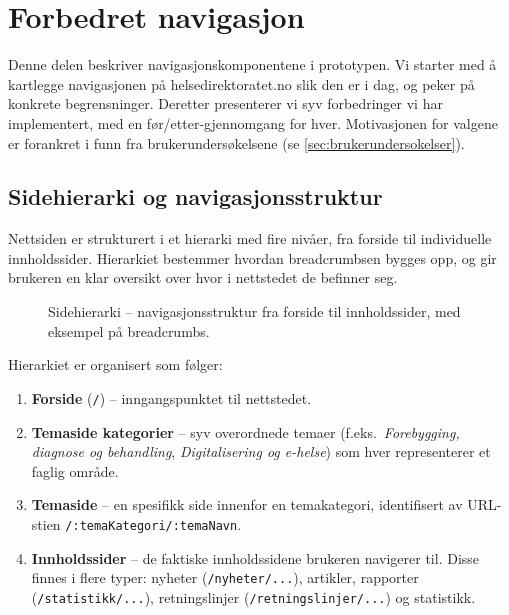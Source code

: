 \section{Forbedret navigasjon}
\label{sec:del3-navigasjon}

Denne delen beskriver navigasjonskomponentene i prototypen. Vi starter med
å kartlegge navigasjonen på helsedirektoratet.no slik den er i dag, og peker
på konkrete begrensninger. Deretter presenterer vi syv forbedringer vi har
implementert, med en før/etter-gjennomgang for hver. Motivasjonen for
valgene er forankret i funn fra brukerundersøkelsene (se
\autoref{sec:brukerundersokelser}).


\subsection{Sidehierarki og navigasjonsstruktur}
\label{sec:sidehierarki}

Nettsiden er strukturert i et hierarki med fire nivåer, fra forside til
individuelle innholdssider. Hierarkiet bestemmer hvordan breadcrumbsen
bygges opp, og gir brukeren en klar oversikt over hvor i nettstedet de
befinner seg.

\begin{figure}[H]
    \centering
    
    \caption{Sidehierarki -- navigasjonsstruktur fra forside til
             innholdssider, med eksempel på breadcrumbs.}
    \label{fig:sidehierarki}
\end{figure}

Hierarkiet er organisert som følger:

\begin{enumerate}
    \item \textbf{Forside} (\texttt{/}) -- inngangspunktet til nettstedet.
    \item \textbf{Temaside kategorier} -- syv overordnede temaer
          (f.eks.\ \textit{Forebygging, diagnose og behandling},
          \textit{Digitalisering og e-helse}) som hver representerer et
          faglig område.
    \item \textbf{Temaside} -- en spesifikk side innenfor en temakategori,
          identifisert av URL-stien \texttt{/:temaKategori/:temaNavn}.
    \item \textbf{Innholdssider} -- de faktiske innholdssidene brukeren
          navigerer til. Disse finnes i flere typer: nyheter
          (\texttt{/nyheter/...}), artikler, rapporter
          (\texttt{/statistikk/...}), retningslinjer
          (\texttt{/retningslinjer/...}) og statistikk.
\end{enumerate}

